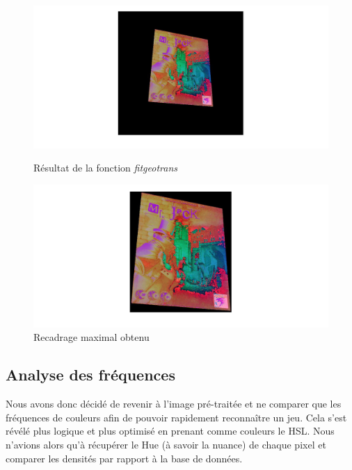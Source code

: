 \documentclass{st50_template}
\begin{document}
\begin{figure}[ht]
    \centering
    \begin{minipage}[b]{0.45\textwidth}
    \includegraphics[width=\textwidth]{images/fitgeotrans.jpg}
    \caption{Résultat de la fonction \emph{fitgeotrans}}
    \label{geotrans}
    \end{minipage}
    \hfill
    \begin{minipage}[b]{0.45\textwidth}
    \includegraphics[width=\textwidth]{images/transRecadre.jpg}
    \caption{Recadrage maximal obtenu}
    \label{fitgeo}
    \end{minipage}
\end{figure}

\subsection{Analyse des fréquences}

Nous avons donc décidé de revenir à l'image pré-traitée et ne comparer que les fréquences de couleurs afin de pouvoir rapidement reconnaître un jeu. Cela s'est révélé plus logique et plus optimisé en prenant comme couleurs le HSL. Nous n'avions alors qu'à récupérer le Hue (à savoir la nuance) de chaque pixel et comparer les densités par rapport à la base de données.
\end{document}

